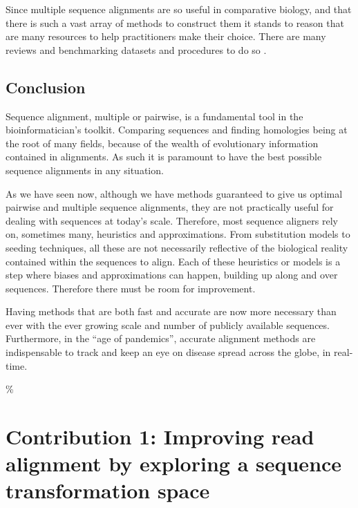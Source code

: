 \documentclass[
  11pt,
  twoside,
  BCOR=10mm,
  listof=totoc]{scrbook}
\begin{document}
Since multiple sequence alignments are so useful in comparative biology, and that there is such a vast array of methods to construct them it stands to reason that are many resources to help practitioners make their choice. There are many reviews and benchmarking datasets and procedures to do so \autocite{notredameRecentEvolutionsMultiple2007,notredameRecentProgressMultiple2002,edgarMultipleSequenceAlignment2006,paisAssessingEfficiencyMultiple2014,thompsonBAliBASEBenchmarkAlignment1999}.

\hypertarget{conclusion-1}{%
\section{Conclusion}\label{conclusion-1}}

Sequence alignment, multiple or pairwise, is a fundamental tool in the bioinformatician's toolkit. Comparing sequences and finding homologies being at the root of many fields, because of the wealth of evolutionary information contained in alignments. As such it is paramount to have the best possible sequence alignments in any situation.

As we have seen now, although we have methods guaranteed to give us optimal pairwise and multiple sequence alignments, they are not practically useful for dealing with sequences at today's scale. Therefore, most sequence aligners rely on, sometimes many, heuristics and approximations. From substitution models to seeding techniques, all these are not necessarily reflective of the biological reality contained within the sequences to align. Each of these heuristics or models is a step where biases and approximations can happen, building up along and over sequences. Therefore there must be room for improvement.

Having methods that are both fast and accurate are now more necessary than ever with the ever growing scale and number of publicly available sequences. Furthermore, in the ``age of pandemics'', accurate alignment methods are indispensable to track and keep an eye on disease spread across the globe, in real-time.

\% \printbibliography[segment=\therefsegment,heading=subbibintoc,title={References for chapter \thechapter}]

\hypertarget{HPC-paper}{%
\chapter{Contribution 1: Improving read alignment by exploring a sequence transformation space}\label{HPC-paper}}
\end{document}
